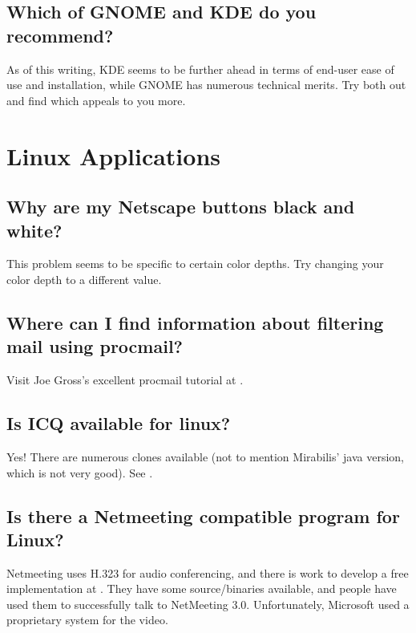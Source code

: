 \documentclass[a4paper]{article}
\begin{document}
\subsection{Which of GNOME and KDE do you recommend?}

As of this writing, KDE seems to be further ahead in terms of end-user
ease of use and installation, while GNOME has numerous technical
merits.  Try both out and find which appeals to you more.




\section{Linux Applications}


\subsection{Why are my Netscape buttons black and white?}

This problem seems to be specific to certain color depths.  Try changing 
your color depth to a different value.




\subsection{Where can I find information about filtering mail using procmail?}

Visit Joe Gross's excellent procmail tutorial at .




\subsection{Is ICQ available for linux?}

Yes!  There are numerous clones available (not to mention Mirabilis'
java version, which is not very good).  See .




\subsection{Is there a Netmeeting compatible program for Linux?}

Netmeeting uses H.323 for audio conferencing, and there is work to develop
a free implementation at . They have some source/binaries available, and people
have used them to successfully talk to NetMeeting 3.0. Unfortunately,
Microsoft used a proprietary system for the video.
\end{document}
